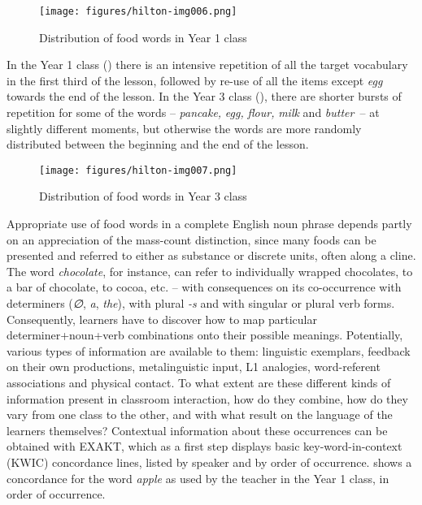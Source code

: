\documentclass[output=paper,colorlinks,citecolor=brown,modfonts,nonflat]{../langscibook}
\begin{document}
\begin{figure}
\caption{\label{fig:hilton:6}Distribution of food words in Year 1 class}
\texttt{[image: figures/hilton-img006.png]}
\end{figure}
 

In the Year 1 class () there is an intensive repetition of all the target vocabulary in the first third of the lesson, followed by re-use of all the items except \textit{egg} towards the end of the lesson. In the Year 3 class (), there are shorter bursts of repetition for some of the words – \textit{pancake,} \textit{egg,} \textit{flour,} \textit{milk} and \textit{butter}~– at slightly different moments, but otherwise the words are more randomly distributed between the beginning and the end of the lesson.

\begin{figure}
\caption{\label{fig:hilton:7}Distribution of food words in Year 3 class}
\texttt{[image: figures/hilton-img007.png]}
\end{figure}
 

Appropriate use of food words in a complete English noun phrase depends partly on an appreciation of the mass-count distinction, since many foods can be presented and referred to either as substance or discrete units, often along a cline. The word \textit{chocolate}, for instance, can refer to individually wrapped chocolates, to a bar of chocolate, to cocoa, etc. – with consequences on its co-occurrence with determiners (\textit{∅}, \textit{a}, \textit{the}), with plural \textit{{}-s} and with singular or plural verb forms. Consequently, learners have to discover how to map particular determiner+noun+verb combinations onto their possible meanings. Potentially, various types of information are available to them: linguistic exemplars, feedback on their own productions, metalinguistic input, L1 analogies, word-referent associations and physical contact. To what extent are these different kinds of information present in classroom interaction, how do they combine, how do they vary from one class to the other, and with what result on the language of the learners themselves? Contextual information about these occurrences can be obtained with EXAKT, which as a first step displays basic key-word-in-context (KWIC) concordance lines, listed by speaker and by order of occurrence.  shows a concordance for the word \textit{apple} as used by the teacher in the Year 1 class, in order of occurrence.
\end{document}
